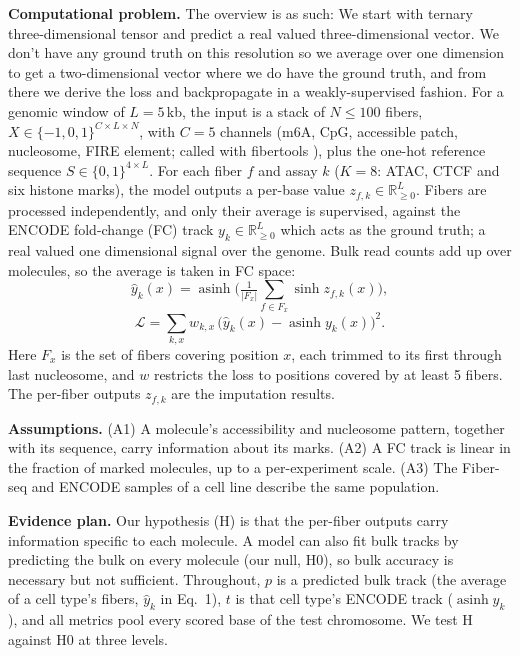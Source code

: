 \documentclass[acmtog]{acmart}
\begin{document}
\textbf{Computational problem.} The overview is as such: We start with ternary three-dimensional tensor and predict a real valued three-dimensional vector. We don't have any ground truth on this resolution so we average over one dimension to get a two-dimensional vector where we do have the ground truth, and from there we derive the loss and backpropagate in a weakly-supervised fashion. For a genomic window of $L=5$\,kb, the input is a stack of $N\le100$ fibers, $X\in\{-1,0,1\}^{C\times L\times N}$, with $C=5$ channels (m6A, CpG, accessible patch, nucleosome, FIRE element; called with fibertools \citep{Jha24}), plus the one-hot reference sequence $S\in\{0,1\}^{4\times L}$. For each fiber $f$ and assay $k$ ($K=8$: ATAC, CTCF and six histone marks), the model outputs a per-base value $z_{f,k}\in\mathbb{R}_{\ge0}^{L}$. Fibers are processed independently, and only their average is supervised, against the ENCODE fold-change (FC) track $y_k\in\mathbb{R}_{\ge0}^{L}$ \citep{ENCODE20} which acts as the ground truth; a real valued one dimensional signal over the genome. Bulk read counts add up over molecules, so the average is taken in FC space:
\begin{equation}
\hat y_k(x) = \operatorname{asinh}\Big(\tfrac{1}{|F_x|}\textstyle\sum_{f\in F_x}\sinh z_{f,k}(x)\Big),
\end{equation}
\begin{equation}
\mathcal{L}=\textstyle\sum_{k,x} w_{k,x}\,\big(\hat y_k(x)-\operatorname{asinh} y_k(x)\big)^2 .
\end{equation}
Here $F_x$ is the set of fibers covering position $x$, each trimmed to its first through last nucleosome, and $w$
restricts the loss to positions covered by at least 5 fibers. The per-fiber outputs $z_{f,k}$ are the imputation results.

\textbf{Assumptions.} (A1) A molecule's accessibility and nucleosome pattern, together with its sequence, carry information about its marks. (A2) A FC track is linear in the fraction of marked molecules, up to a per-experiment scale. (A3) The Fiber-seq and ENCODE samples of a cell line describe the same population.

\textbf{Evidence plan.} Our hypothesis (H) is that the per-fiber outputs carry information specific to each molecule. A model can also fit bulk tracks by predicting the bulk on every molecule (our null, H0), so bulk accuracy is necessary but not sufficient. Throughout, $p$ is a predicted bulk track (the average of a cell type's fibers, $\hat y_k$ in Eq.~1), $t$ is that cell type's ENCODE track ($\operatorname{asinh} y_k$), and all metrics pool every scored base of the test chromosome. We test H against H0 at three levels.
\end{document}
